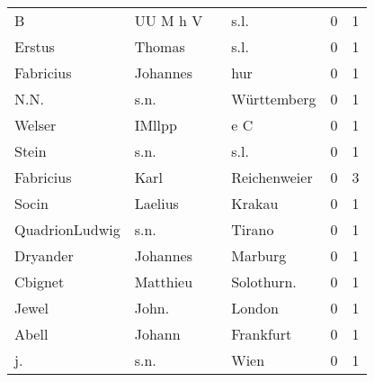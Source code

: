 \begin{tabular}{llllrr}
                        B &                           UU M h V &             &                                        s.l. &          0 &         1 \\
                   Erstus &                             Thomas &             &                                        s.l. &          0 &         1 \\
                Fabricius &                           Johannes &             &                                         hur &          0 &         1 \\
                     N.N. &                               s.n. &             &                                 Württemberg &          0 &         1 \\
                   Welser &                             IMllpp &             &                                         e C &          0 &         1 \\
                    Stein &                               s.n. &             &                                        s.l. &          0 &         1 \\
                Fabricius &                               Karl &             &                                Reichenweier &          0 &         3 \\
                    Socin &                            Laelius &             &                                      Krakau &          0 &         1 \\
           QuadrionLudwig &                               s.n. &             &                                      Tirano &          0 &         1 \\
                 Dryander &                           Johannes &             &                                     Marburg &          0 &         1 \\
                  Cbignet &                           Matthieu &             &                                 Solothurn.  &          0 &         1 \\
                    Jewel &                              John. &             &                                      London &          0 &         1 \\
                    Abell &                             Johann &             &                                   Frankfurt &          0 &         1 \\
                       j. &                               s.n. &             &                                        Wien &          0 &         1 \\

\end{tabular}
